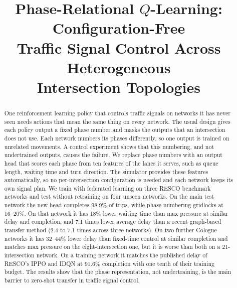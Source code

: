 \documentclass[conference]{IEEEtran}
\begin{document}
\title{Phase-Relational $Q$-Learning: Configuration-Free\\
Traffic Signal Control Across Heterogeneous\\Intersection Topologies}

\author{
}

\maketitle

\begin{abstract}
One reinforcement learning policy that controls traffic signals on networks it has never
seen needs actions that mean the same thing on every network. The usual design gives each
policy output a fixed phase number and masks the outputs that an intersection does not
use. Each network numbers its phases differently, so one output is trained on unrelated
movements. A control experiment shows that this numbering, and not undertrained outputs,
causes the failure. We replace phase numbers with an output head that scores each phase
from ten features of the lanes it serves, such as queue length, waiting time and turn
direction. The simulator provides these features automatically, so no per-intersection
configuration is needed and each network keeps its own signal plan. We train with
federated learning on three RESCO benchmark networks and test without retraining on four
unseen networks. On the main test network the new head completes 98.9\% of trips, while
phase numbering gridlocks at 16--20\%. On that network it has 18\% lower waiting time than
max pressure at similar delay and completion, and 7.1 times lower average delay than a
recent graph-based transfer method (2.4 to 7.1 times across three networks). On two further
Cologne networks it has 32--44\% lower delay than fixed-time control at similar completion
and matches max pressure on the eight-intersection one, but it is worse than both on a
21-intersection network. On a training network it matches the published delay of RESCO's
IPPO and IDQN at 91.6\% completion with one tenth of their training budget. The results
show that the phase representation, not undertraining, is the main barrier to zero-shot
transfer in traffic signal control.
\end{abstract}
\end{document}
